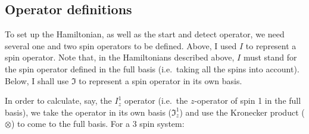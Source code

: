 \documentclass[11pt,a4paper]{article}
\begin{document}
\subsection{Operator definitions}
To set up the Hamiltonian, as well as the start and detect operator, we need several one
and two spin operators to be defined. Above, I used $I$ to represent a spin operator. Note
that, in the Hamiltonians described above, $I$ must stand for the spin operator defined in
the full basis (i.e.\ taking all the spins into account). Below, I shall use $\mathfrak{I}$
to represent a spin operator in its own basis. 

In order to calculate, say, the $I_z^1$ operator (i.e.\ the $z$-operator of spin 1 in the
full basis), we take the operator in its own basis ($\mathfrak{I}_z^1$) and use the
Kronecker product ($\otimes$) to come to the full basis. For a 3 spin system:
\end{document}
